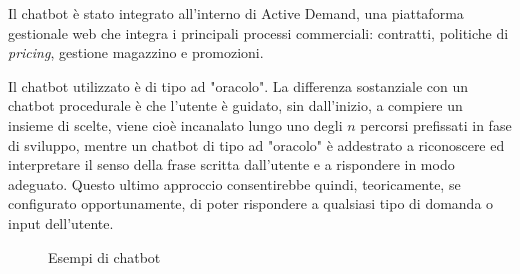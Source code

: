 Il chatbot è stato integrato all'interno di Active Demand, una piattaforma gestionale web che integra i principali processi commerciali: contratti, politiche di \textit{pricing}, gestione magazzino e promozioni.

Il chatbot utilizzato è di tipo ad "oracolo".
%
La differenza sostanziale con un chatbot procedurale è che l'utente è guidato, sin dall'inizio, a compiere un insieme di scelte, viene cioè incanalato lungo uno degli $n$ percorsi prefissati in fase di sviluppo, mentre un chatbot di tipo ad "oracolo" è addestrato a riconoscere ed interpretare il senso della frase scritta dall'utente e a rispondere in modo adeguato.
%
Questo ultimo approccio consentirebbe quindi, teoricamente, se configurato opportunamente, di poter rispondere a qualsiasi tipo di domanda o input dell'utente.

\begin{figure}%
    \centering
    \qquad
    \caption{Esempi di chatbot}%
    \label{fig:example}%
\end{figure}
